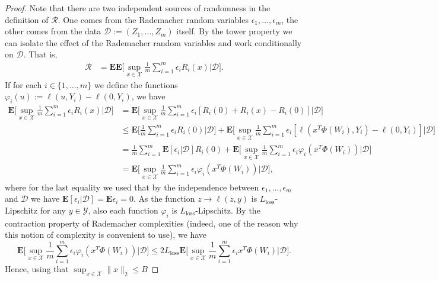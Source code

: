 \begin{proof}
Note that there are two independent sources of randomness in the definition of $\mathcal{R}$. One comes from the Rademacher random variables $\epsilon_1,\ldots,\epsilon_m$, the other comes from the data $\mathcal{D}:=(Z_1,\dots,Z_m)$ itself. By the tower property we can isolate the effect of the Rademacher random variables and work conditionally on $\mathcal{D}$. That is,
\begin{align*}
	\mathcal{R} 
	&= \mathbf{E} \mathbf{E} \bigg[ \sup_{x\in\mathcal{X}} \frac{1}{m}\sum_{i=1}^m\epsilon_i R_i(x) \bigg| \mathcal{D}\bigg].
\end{align*}
If for each $i\in\{1,\ldots,m\}$ we define the functions $\varphi_i(u) := \ell(u,Y_i) - \ell(0,Y_i)$, we have
\begin{align*}
	\mathbf{E} \bigg[ \sup_{x\in\mathcal{X}} \frac{1}{m}\sum_{i=1}^m\epsilon_i R_i(x) \bigg| \mathcal{D} \bigg]
	&= \mathbf{E} \bigg[ \sup_{x\in\mathcal{X}} \frac{1}{m}\sum_{i=1}^m\epsilon_i [R_i(0) + R_i(x)-R_i(0)] \bigg| \mathcal{D} \bigg]\\
	&\le \mathbf{E} \bigg[ \frac{1}{m}\sum_{i=1}^m\epsilon_i R_i(0) \bigg| \mathcal{D} \bigg]
	+ \mathbf{E} \bigg[ \sup_{x\in\mathcal{X}} \frac{1}{m}\sum_{i=1}^m\epsilon_i [\ell(x^T\Phi(W_i),Y_i)-\ell(0,Y_i)] \bigg| \mathcal{D} \bigg]\\
	&= \frac{1}{m}\sum_{i=1}^m \mathbf{E} [\epsilon_i | \mathcal{D}] R_i(0) + 
	\mathbf{E} \bigg[ \sup_{x\in\mathcal{X}} \frac{1}{m}\sum_{i=1}^m\epsilon_i \varphi_i(x^T\Phi(W_i)) \bigg| \mathcal{D} \bigg]\\
	&= \mathbf{E} \bigg[ \sup_{x\in\mathcal{X}} \frac{1}{m}\sum_{i=1}^m\epsilon_i \varphi_i(x^T\Phi(W_i)) \bigg| \mathcal{D} \bigg],
\end{align*}
where for the last equality we used that by the independence between $\epsilon_1,\ldots,\epsilon_m$ and $\mathcal{D}$ we have $\mathbf{E} [\epsilon_i | \mathcal{D}]=\mathbf{E} \epsilon_i = 0$. As the function $z\rightarrow \ell(z,y)$ is $L_\textrm{loss}$-Lipschitz for any $y\in\mathcal{Y}$, also each function $\varphi_i$ is $L_\textrm{loss}$-Lipschitz. By the contraction property of Rademacher complexities (indeed, one of the reason why this notion of complexity is convenient to use), we have
$$
	\mathbf{E} \bigg[ \sup_{x\in\mathcal{X}} \frac{1}{m}\sum_{i=1}^m\epsilon_i \varphi_i(x^T\Phi(W_i)) \bigg| \mathcal{D} \bigg]
	\le
	2L_\textrm{loss}\mathbf{E} \bigg[ \sup_{x\in\mathcal{X}} \frac{1}{m}\sum_{i=1}^m\epsilon_i x^T\Phi(W_i) \bigg| \mathcal{D} \bigg].
$$
Hence, using that $\sup_{x\in\mathcal{X}}\|x\|_2 \le B$

\end{proof}
